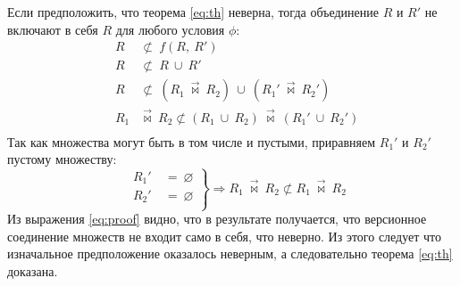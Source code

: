 \indent Если предположить, что теорема \ref{eq:th} неверна, тогда объединение $R$ и $R'$ не включают в себя $R$ для любого условия $\phi$:
\begin{eqnarray}
	&R& \not\subset\ f(R,\ R') \\
	&R& \not\subset\ R\ \cup\ R' \\
	&R& \not\subset\ (R_1\ \overrightarrow{\bowtie}\ R_2)\ \cup\ (R_1'\ \overrightarrow{\bowtie}\ R_2') \\
	&R_1& \overrightarrow{\bowtie}\ R_2 \not\subset (R_1\ \cup\ R_2)\ \overrightarrow{\bowtie}\ (R_1'\ \cup\ R_2')\label{eq:wrong} \\
\end{eqnarray}
\indent Так как множества могут быть в том числе и пустыми, приравняем $R_1'$ и $R_2'$ пустому множеству:
\begin{equation}
	\label{eq:proof}
	\left.
		\begin{array}{ccc}
			&R_1'\ & =\ \varnothing \\
			&R_2'\ & =\ \varnothing \\
		\end{array}
	\right\} \Rightarrow
	R_1\ \overrightarrow{\bowtie}\ R_2 \not\subset R_1\ \overrightarrow{\bowtie}\ R_2
\end{equation}
\indent Из выражения \ref{eq:proof} видно, что в результате получается, что версионное соединение множеств не входит само в себя, что неверно.
Из этого следует что изначальное предположение оказалось неверным, а следовательно теорема \ref{eq:th} доказана.

		

